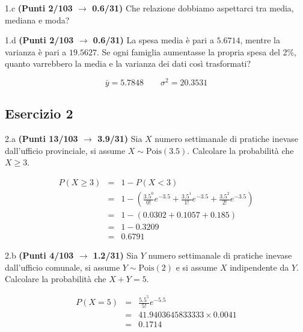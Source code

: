 \documentclass[
  11pt,
]{book}
\theoremstyle{mytheoremstyle}
\theoremstyle{mydefstyle}
\newenvironment{sol}
  {
  \begin{tcolorbox}[enhanced,breakable,arc=0.1mm,boxrule=1pt,colback=white,colframe=iblue,
  title=\bf \fontfamily{lmss}\selectfont \hspace{.5 cm} Soluzione,drop fuzzy shadow]

}{
\end{tcolorbox}
  }
\begin{document}
1.c \textbf{(Punti 2/103 \(\rightarrow\) 0.6/31)} Che relazione dobbiamo aspettarci tra media, mediana e moda?

1.d \textbf{(Punti 2/103 \(\rightarrow\) 0.6/31)} La spesa media è pari a \(5.6714\), mentre la varianza è pari a \(19.5627\).
Se ogni famiglia aumentasse la propria spesa del 2\%, quanto varrebbero la media e la varianza dei dati così trasformati?

\begin{sol}
\[
\bar y = 5.7848\qquad \sigma^2 = 20.3531
\]

\end{sol}

\subsection{Esercizio 2}\label{esercizio-2-35}

2.a \textbf{(Punti 13/103 \(\rightarrow\) 3.9/31)} Sia \(X\) numero settimanale di pratiche inevase dall'ufficio provinciale, si assume \(X\sim\text{Pois}(3.5)\). Calcolare la probabilità che \(X\geq 3\).

\begin{sol}
\begin{eqnarray*}
   P( X \geq 3 ) &=& 1-P( X < 3 ) \\                 &=& 1-\left( \frac{ 3.5 ^{ 0 }}{ 0 !}e^{- 3.5 }+\frac{ 3.5 ^{ 1 }}{ 1 !}e^{- 3.5 }+\frac{ 3.5 ^{ 2 }}{ 2 !}e^{- 3.5 } \right)\\                 &=& 1-( 0.0302+0.1057+0.185 )\\                 &=& 1- 0.3209 \\                 &=&   0.6791 
\end{eqnarray*}

\end{sol}

2.b \textbf{(Punti 4/103 \(\rightarrow\) 1.2/31)} Sia \(Y\) numero settimanale di pratiche inevase dall'ufficio comunale, si assume \(Y\sim\text{Pois}(2)\) e si assume \(X\) indipendente da \(Y\). Calcolare la probabilità che \(X+Y=5\).

\begin{sol}
\begin{eqnarray*}
   P( X = 5 )  &=& \frac{ 5.5 ^{ 5 }}{ 5 !}e^{- 5.5 }\\                 &=& 41.9403645833333 \times 0.0041 \\                 &=& 0.1714 
\end{eqnarray*}

\end{sol}
\end{document}
